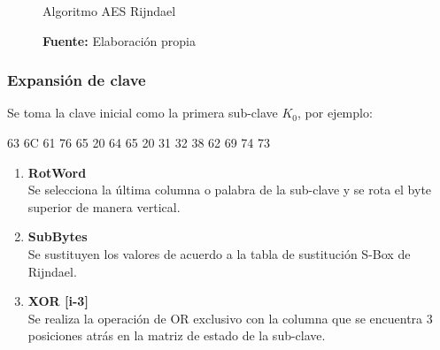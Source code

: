 \documentclass[../main/main.tex]{subfiles}
\begin{document}
  \begin{figure}[H]
    \centering
    \caption{Algoritmo AES Rijndael}
    
    \caption*{\textbf{Fuente:} Elaboración propia}
  \end{figure}

  \subsubsection{Expansión de clave}

  Se toma la clave inicial como la primera sub-clave $K_0$, por ejemplo:

  \begin{center}
    63 6C 61 76 65 20 64 65 20 31 32 38 62 69 74 73
  \end{center}

  \begin{enumerate}[label=\textbf{\arabic*}.]
    \item \textbf{RotWord} \\
      Se selecciona la última columna o palabra de la sub-clave y se rota el byte superior de manera vertical.

      \begin{table}[H]
        \centering
        
      \end{table}

    \item \textbf{SubBytes} \\
      Se sustituyen los valores de acuerdo a la tabla de sustitución S-Box de Rijndael.

      \begin{table}[H]
        \centering
        
      \end{table}

    \item \textbf{XOR [i-3]} \\
      Se realiza la operación de OR exclusivo con la columna que se encuentra 3 posiciones atrás en la matriz de estado de la sub-clave.

      \begin{table}[H]
        \centering
        
      \end{table}

      
  \end{enumerate}
\end{document}
